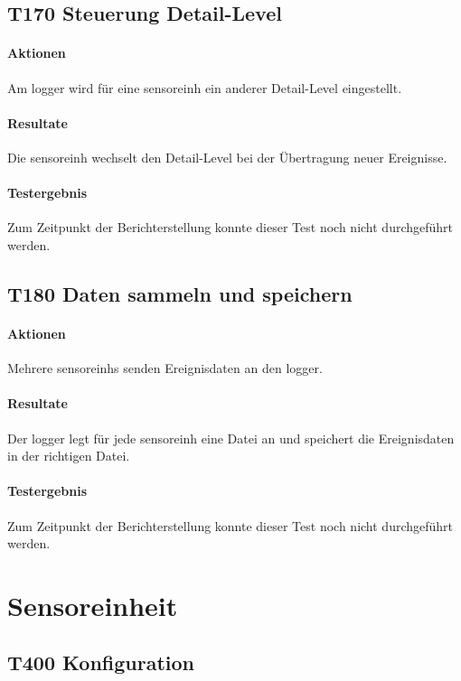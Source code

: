 \subsection{T170 Steuerung Detail-Level}
\paragraph{Aktionen} Am \gls{logger} wird für eine \gls{sensoreinh} ein anderer Detail-Level eingestellt.

\paragraph{Resultate} Die \gls{sensoreinh} wechselt den Detail-Level bei der Übertragung neuer Ereignisse.

\paragraph{Testergebnis} Zum Zeitpunkt der Berichterstellung konnte dieser Test noch nicht durchgeführt werden. 

\subsection{T180 Daten sammeln und speichern}
\paragraph{Aktionen} Mehrere \glspl{sensoreinh} senden Ereignisdaten an den \gls{logger}. 

\paragraph{Resultate} Der \gls{logger} legt für jede \gls{sensoreinh} eine Datei an und speichert die Ereignisdaten in der richtigen Datei.

\paragraph{Testergebnis} Zum Zeitpunkt der Berichterstellung konnte dieser Test noch nicht durchgeführt werden. 


\section{Sensoreinheit}
\subsection{T400 Konfiguration}
